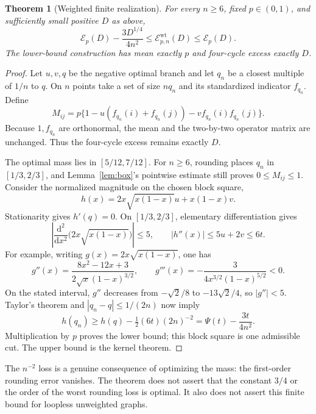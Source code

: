\documentclass[11pt]{article}
\newtheorem{theorem}{Theorem}[section]
\theoremstyle{definition}
\newcommand{\1}{\mathbf 1}
\newcommand{\calE}{\mathcal E}
\begin{document}
\begin{theorem}[Weighted finite realization]\label{thm:finite}
For every $n\ge6$, fixed $p\in(0,1)$, and sufficiently small positive $D$ as above,
\begin{equation}\label{eq:rounding}
 \calE_p(D)-\frac{3D^{1/4}}{4n^2}
 \le\calE_{p,n}^{\mathrm{wt}}(D)\le\calE_p(D).
\end{equation}
The lower-bound construction has mean exactly $p$ and four-cycle excess exactly $D$.
\end{theorem}
\begin{proof}
Let $u,v,q$ be the negative optimal branch and let $q_n$ be a closest multiple of $1/n$ to $q$. On $n$ points take a set of size $nq_n$ and its standardized indicator $f_{q_n}$. Define
\[
 M_{ij}=p\{1-u(f_{q_n}(i)+f_{q_n}(j))-vf_{q_n}(i)f_{q_n}(j)\}.
\]
Because $1,f_{q_n}$ are orthonormal, the mean and the two-by-two operator matrix are unchanged. Thus the four-cycle excess remains exactly $D$.

The optimal mass lies in $[5/12,7/12]$. For $n\ge6$, rounding places $q_n$ in $[1/3,2/3]$, and Lemma~\ref{lem:box}'s pointwise estimate still proves $0\le M_{ij}\le1$. Consider the normalized magnitude on the chosen block square,
\[
 h(x)=2x\sqrt{x(1-x)}u+x(1-x)v.
\]
Stationarity gives $h'(q)=0$. On $[1/3,2/3]$, elementary differentiation gives
\[
 \left|\frac{\mathrm d^2}{\mathrm dx^2}\bigl(2x\sqrt{x(1-x)}\bigr)\right|\le5,
 \qquad |h''(x)|\le5u+2v\le6t.
\]
For example, writing $g(x)=2x\sqrt{x(1-x)}$, one has
\[
 g''(x)=\frac{8x^2-12x+3}{2\sqrt{x}(1-x)^{3/2}},\qquad
 g'''(x)=-\frac{3}{4x^{3/2}(1-x)^{5/2}}<0.
\]
On the stated interval, $g''$ decreases from $-\sqrt2/8$ to $-13\sqrt2/4$, so $|g''|<5$.
Taylor's theorem and $|q_n-q|\le1/(2n)$ now imply
\[
 h(q_n)\ge h(q)-\tfrac12(6t)(2n)^{-2}
              =\Psi(t)-\frac{3t}{4n^2}.
\]
Multiplication by $p$ proves the lower bound; this block square is one admissible cut. The upper bound is the kernel theorem.
\end{proof}

The $n^{-2}$ loss is a genuine consequence of optimizing the mass: the first-order rounding error vanishes. The theorem does not assert that the constant $3/4$ or the order of the worst rounding loss is optimal. It also does not assert this finite bound for loopless unweighted graphs.
\end{document}
